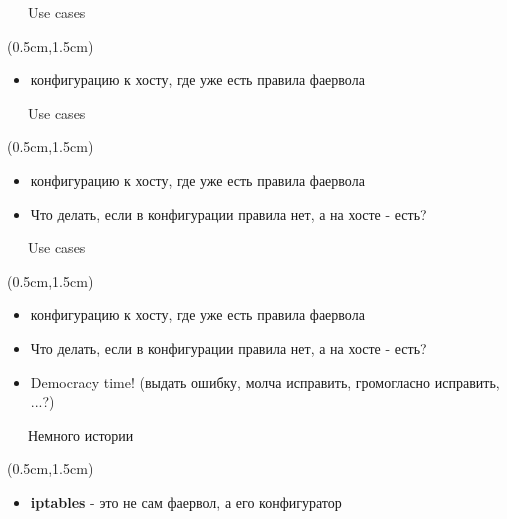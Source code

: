 \documentclass[xetex,18pt,aspectratio=43]{beamer}
\begin{document}
\begin{Large}
\begin{frame}{\ \ \ Use cases}
\begin{textblock*}{\framewidth-0.8cm}(0.5cm,1.5cm)
\begin{itemize}
  \item {\color {darkpastelgreen}{\bf Я применяю}} конфигурацию к хосту, где уже
    есть правила фаервола
\end{itemize}
\end{textblock*}
\end{frame}

\begin{frame}{\ \ \ Use cases}
\begin{textblock*}{\framewidth-0.8cm}(0.5cm,1.5cm)
\begin{itemize}
  \item {\color {darkpastelgreen}{\bf Я применяю}} конфигурацию к хосту, где уже
    есть правила фаервола
  \item Что делать, если в конфигурации правила нет, а на хосте - есть?
\end{itemize}
\end{textblock*}
\end{frame}

\begin{frame}{\ \ \ Use cases}
\begin{textblock*}{\framewidth-0.8cm}(0.5cm,1.5cm)
\begin{itemize}
  \item {\color {darkpastelgreen}{\bf Я применяю}} конфигурацию к хосту, где уже
    есть правила фаервола
  \item Что делать, если в конфигурации правила нет, а на хосте - есть?
  \item Democracy time! ({\color {darkorange}выдать ошибку}, {\color {darkorchid}молча исправить}, {\color {darkpink}громогласно исправить}, ...?)
\end{itemize}
\end{textblock*}
\end{frame}

\begin{frame}{\ \ \ Немного истории}
\begin{textblock*}{\framewidth-0.8cm}(0.5cm,1.5cm)
\begin{itemize}
  \item {\bf iptables} - это не сам фаервол, а его конфигуратор
\end{itemize}
\end{textblock*}
\end{frame}


\end{Large}
\end{document}
